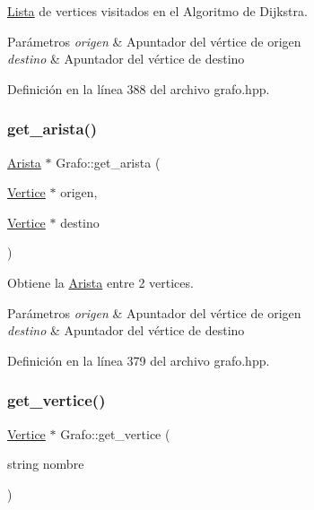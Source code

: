 \hyperlink{classLista}{Lista} de vertices visitados en el \textquotesingle{}Algoritmo de Dijkstra\textquotesingle{}. 


\begin{DoxyParams}{Parámetros}
{\em origen} & Apuntador del vértice de origen \\
\hline
{\em destino} & Apuntador del vértice de destino \\
\hline
\end{DoxyParams}


Definición en la línea 388 del archivo grafo.\+hpp.

\mbox{\label{classGrafo_aed632e897451b00634e8f1d8088c12c8}} 
\subsubsection{\texorpdfstring{get\+\_\+arista()}{get\_arista()}}
{\footnotesize\ttfamily \hyperlink{classArista}{Arista} $\ast$ Grafo\+::get\+\_\+arista (\begin{DoxyParamCaption}\item[{\hyperlink{classVertice}{Vertice} $\ast$}]{origen,  }\item[{\hyperlink{classVertice}{Vertice} $\ast$}]{destino }\end{DoxyParamCaption})}



Obtiene la \hyperlink{classArista}{Arista} entre 2 vertices. 


\begin{DoxyParams}{Parámetros}
{\em origen} & Apuntador del vértice de origen \\
\hline
{\em destino} & Apuntador del vértice de destino \\
\hline
\end{DoxyParams}


Definición en la línea 379 del archivo grafo.\+hpp.

\mbox{\label{classGrafo_ac088cffbe30ed4c895ac831233251d99}} 
\subsubsection{\texorpdfstring{get\+\_\+vertice()}{get\_vertice()}}
{\footnotesize\ttfamily \hyperlink{classVertice}{Vertice} $\ast$ Grafo\+::get\+\_\+vertice (\begin{DoxyParamCaption}\item[{string}]{nombre }\end{DoxyParamCaption})}



